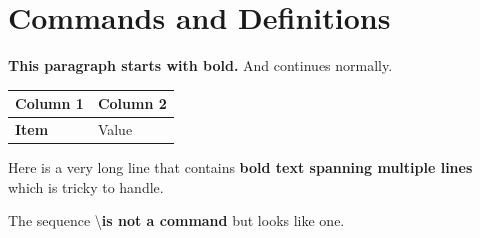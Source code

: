 \documentclass{article}
\begin{document}
\section{Commands and Definitions}

\newcommand{\myvec}{{\bf v}}
\newcommand{\mybold}[1]{{\bf #1}}

{\bf This paragraph starts with bold.} And continues normally.

\begin{tabular}{ll}
	\hline
	{\bf Column 1} & {\bf Column 2} \\
	\hline
	{\bf Item} & Value \\
	\hline
\end{tabular}

Here is a very long line that contains {\bf bold text 
spanning multiple lines} which is tricky to handle.

The sequence \textbackslash{\bf is not a command} but looks like one.
\end{document}
